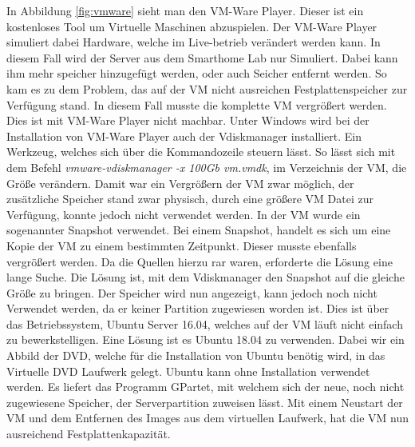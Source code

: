 In Abbildung \ref{fig:vmware} sieht man den VM-Ware Player. Dieser ist ein kostenloses Tool um Virtuelle Maschinen abzuspielen. Der VM-Ware Player simuliert dabei Hardware, welche im Live-betrieb verändert werden kann. \autocite{vmwareinc.2018} In diesem Fall wird der Server aus dem Smarthome Lab nur Simuliert. Dabei kann ihm mehr speicher hinzugefügt werden, oder auch Seicher entfernt werden. So kam es zu dem Problem, das auf der \ac{VM} nicht ausreichen Festplattenspeicher zur Verfügung stand. In diesem Fall musste die komplette \ac{VM} vergrößert werden. Dies ist mit VM-Ware Player nicht machbar. Unter Windows wird bei der Installation von VM-Ware Player auch der Vdiskmanager installiert. Ein Werkzeug, welches sich über die Kommandozeile steuern lässt. So lässt sich mit dem Befehl \textit{vmware-vdiskmanager -x 100Gb vm.vmdk}, im Verzeichnis der \ac{VM}, die Größe verändern. \autocite{ThomasKrennAG.2018} Damit war ein Vergrößern der \ac{VM} zwar möglich, der zusätzliche Speicher stand zwar physisch, durch eine größere \ac{VM} Datei zur Verfügung, konnte jedoch nicht verwendet werden. In der \ac{VM} wurde ein sogenannter Snapshot verwendet. Bei einem Snapshot, handelt es sich um eine Kopie der \ac{VM} zu einem bestimmten Zeitpunkt. Dieser musste ebenfalls vergrößert werden. Da die Quellen hierzu rar waren, erforderte die Lösung eine lange Suche. Die Lösung ist, mit dem Vdiskmanager den Snapshot auf die gleiche Größe zu bringen. Der Speicher wird nun angezeigt, kann jedoch noch nicht Verwendet werden, da er keiner Partition zugewiesen worden ist. Dies ist über das Betriebssystem, Ubuntu Server 16.04, welches auf der \ac{VM} läuft nicht einfach zu bewerkstelligen. Eine Lösung ist es Ubuntu 18.04 zu verwenden. Dabei wir ein Abbild der DVD, welche für die Installation von Ubuntu benötig wird, in das Virtuelle DVD Laufwerk gelegt. Ubuntu kann ohne Installation verwendet werden. Es liefert das Programm GPartet, mit welchem sich der neue, noch nicht zugewiesene Speicher, der Serverpartition zuweisen lässt. Mit einem Neustart der \ac{VM} und dem Entfernen des Images aus dem virtuellen Laufwerk, hat die \ac{VM} nun ausreichend Festplattenkapazität.\autocite{automatix.}

